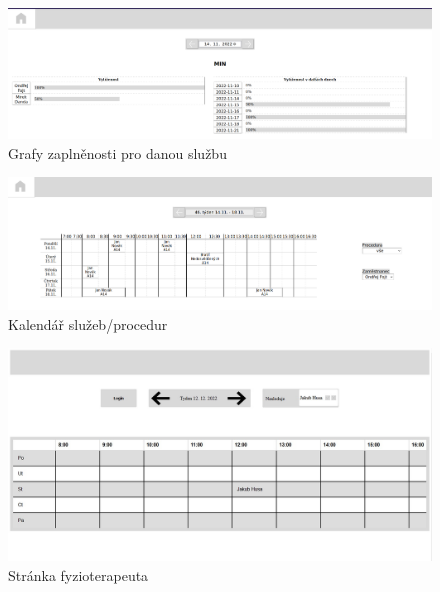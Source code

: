 \begin{figure}[htbp]
    \centering
    \includegraphics[angle=0, origin=c, width = \textwidth]{doc/latex/fig/implementation/admin/service.png}
    \caption{Grafy zaplněnosti pro danou službu}
\end{figure}

\begin{figure}[htbp]
    \centering
    \includegraphics[angle=0, origin=c, width = \textwidth]{doc/latex/fig/implementation/admin/calendar.png}
    \caption{Kalendář služeb/procedur}
\end{figure}



\begin{figure}[htbp]
    \centering
    \includegraphics[angle=0, origin=c, width = \textwidth]{doc/latex/fig/implementation/fyzio/printscreen_fyzio.jpg}
    \caption{Stránka fyzioterapeuta}
\end{figure}
